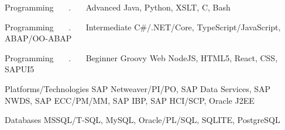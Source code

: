 

\begin{cvskills}

  \cvskill
    {Programming ~~~.~~~ Advanced} %
    {Java, Python, XSLT, C, Bash} %


\cvskill
    {Programming ~~~.~~~ Intermediate} %
    {C\#/.NET/Core, TypeScript/JavaScript, ABAP/OO-ABAP}

\cvskill
    {Programming ~~~.~~~ Beginner} %
    {Groovy}
  \cvskill
    {Web} %
    {NodeJS, HTML5, React, CSS, SAPUI5} %

  \cvskill
    {Platforms/Technologies} %
    {SAP Netweaver/PI/PO, SAP Data Services, SAP NWDS, SAP ECC/PM/MM, SAP IBP, SAP HCI/SCP, Oracle J2EE} %

  \cvskill
    {Databases} %
    {MSSQL/T-SQL, MySQL, Oracle/PL/SQL, SQLITE, PostgreSQL} %


\end{cvskills}
